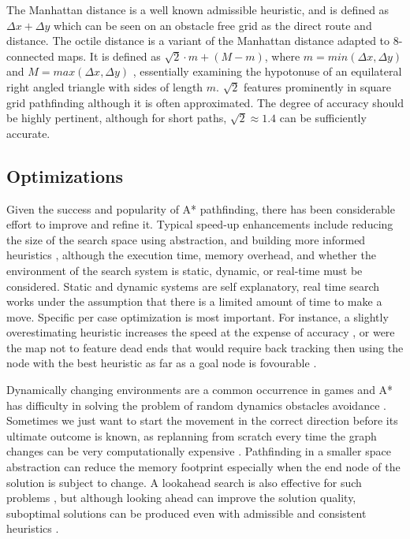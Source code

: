 \documentclass{scrartcl}
\begin{document}
The Manhattan distance is a well known admissible heuristic, and is defined as $\Delta x + \Delta y$ \cite{botea2013pathfinding} which can be seen on an obstacle free grid as the direct route and distance.  The octile distance is a variant of the Manhattan distance adapted to 8-connected maps. It is defined as $\sqrt{2} \cdot m + (M - m)$, where $m = min(\Delta x, \Delta y)$ and $M = max(\Delta x, \Delta y)$ \cite{botea2013pathfinding}, essentially examining the hypotonuse of an equilateral right angled triangle with sides of length $m$.  $\sqrt{2}$ features prominently in square grid pathfinding although it is often approximated.  The degree of accuracy should be highly pertinent, although for short paths, $\sqrt{2} \approx 1.4$ can be sufficiently accurate.

\subsection*{Optimizations}

Given the success and popularity of A* pathfinding, there has been considerable effort to improve and refine it.  Typical speed-up enhancements include reducing the size of the search space using abstraction, and building more informed heuristics \cite{harabor2010breaking}, although the execution time, memory overhead, and whether the environment of the search system is static, dynamic, or real-time \cite{hart1968formal} must be considered.  Static and dynamic systems are self explanatory, real time search works under the assumption that there is a limited amount of time to make a move.  Specific per case optimization is most important. For instance, a slightly overestimating heuristic increases the speed at the expense of accuracy \cite{millington2016artificial}, or were the map not to feature dead ends that would require back tracking then using the node with the best heuristic as far as a goal node is fovourable \cite{togelius20102009}.

Dynamically changing environments \cite{botea2011ultra} are a common occurrence in games and A* has difficulty in solving the problem of random dynamics obstacles avoidance \cite{wang2012game}.  Sometimes we just want to start the movement in the correct direction before its ultimate outcome is known, as replanning from scratch every time the graph changes can be very computationally expensive \cite{ferguson2005guide}.  Pathfinding in a smaller space abstraction can reduce the memory footprint \cite{lawrence2013database} especially when the end node of the solution is subject to change.  A lookahead search is also effective for such problems \cite{korf1990real}, but although looking ahead can improve the solution quality, suboptimal solutions can be produced even with admissible and consistent heuristics \cite{bulitko2003lookahead}.
\end{document}
